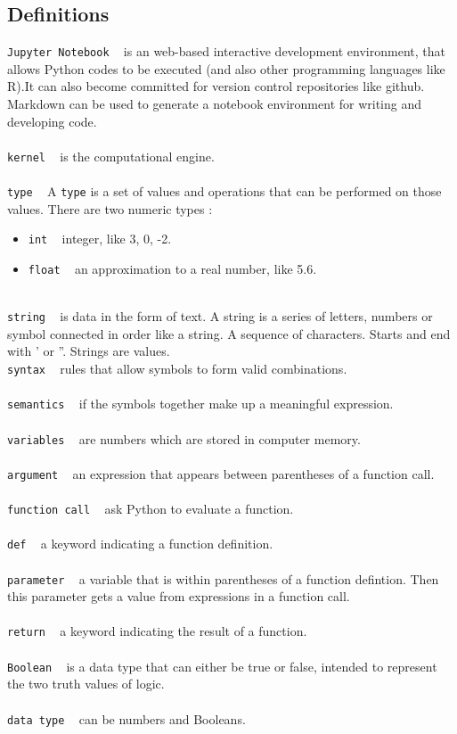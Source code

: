 \documentclass{article}
\begin{document}
\subsection{Definitions}
\texttt{Jupyter Notebook} ~ is an web-based interactive development environment, that allows Python codes to be executed (and also other programming languages like R).It can also become committed for version control repositories like github. Markdown can be used to generate a notebook environment for writing and developing code. \\
\\
\texttt{kernel} ~ is the computational engine. \\ 
\\
\texttt{type} ~ A \texttt{type} is a set of values and operations that can be performed on those values. There are two numeric types : 
\begin{itemize}
\item \texttt{int} ~ integer, like 3, 0, -2.
\item \texttt{float} ~ an approximation to a real number, like 5.6.
\end{itemize}\\
\texttt{string} ~ is data in the form of text. A string is a series of letters, numbers or symbol connected in order like a string. A sequence of characters. Starts and end with ' or ''. Strings are values. \\
\texttt{syntax} ~ rules that allow symbols to form valid combinations.\\
\\
\texttt{semantics} ~ if the symbols together make up a meaningful expression. \\
\\
\texttt{variables} ~ are numbers which are stored in computer memory. \\
\\
\texttt{argument} ~ an expression that appears between parentheses of a function call.\\
\\
\texttt{function call} ~ ask Python to evaluate a function.\\
\\
\texttt{def} ~ a keyword indicating a function definition.\\
\\
\texttt{parameter} ~ a variable that is within parentheses of a function defintion. Then this parameter gets a value from expressions in a function call.\\
\\
\texttt{return} ~ a keyword indicating the result of a function.\\
\\
\texttt{Boolean} ~ is a data type that can either be true or false, intended to represent the two truth values of logic. \\
\\
\texttt{data type} ~ can be numbers and Booleans.\\
\end{document}
